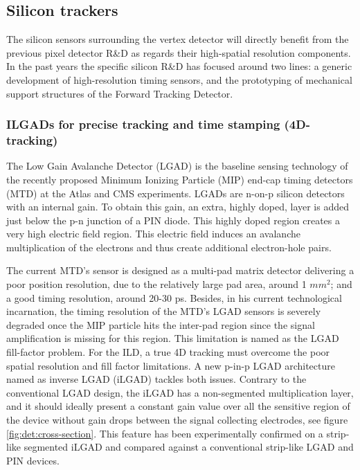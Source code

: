 \subsection{Silicon trackers}

The silicon sensors surrounding the vertex detector will directly benefit from the previous pixel detector R\&D as regards their high-spatial resolution components. In the past years the specific silicon R\&D has focused around two lines: a generic development of high-resolution timing sensors, and the prototyping of mechanical support structures of the Forward Tracking Detector.

\subsubsection{ILGADs for precise tracking and time stamping (4D-tracking)}

The Low Gain Avalanche Detector (LGAD) is the baseline sensing technology of the recently proposed Minimum Ionizing Particle (MIP) end-cap timing detectors (MTD) at the Atlas and CMS experiments. LGADs are n-on-p silicon detectors with an internal gain. To obtain this gain, an extra, highly doped, layer is added just below the p-n junction of a PIN diode. This highly doped region creates a very high electric field region. This electric field induces an avalanche multiplication of the electrons and thus create additional electron-hole pairs\cite{PELLEGRINI201412}. 

The current MTD's sensor is designed as a multi-pad matrix detector delivering a poor position resolution, due to the relatively large pad area, around 1 $mm^2$; and a good timing resolution, around 20-30 ps. Besides, in his current technological incarnation, the timing resolution of the MTD's LGAD sensors is severely degraded once the MIP particle hits the inter-pad region since the signal amplification is missing for this region. This limitation is named as the LGAD fill-factor problem. For the ILD, a true 4D tracking  must overcome the poor spatial resolution and fill factor limitations. A new p-in-p LGAD architecture named as inverse LGAD (iLGAD) tackles both issues\cite{Carulla_2016}. Contrary to the conventional LGAD design, the iLGAD has a non-segmented multiplication layer, and it should ideally present a constant gain value over all the sensitive region of the device without gain drops between the signal collecting electrodes, see figure\,\ref{fig:det:cross-section}. This feature has been experimentally confirmed on a strip-like segmented iLGAD and compared against a conventional strip-like LGAD and PIN devices\cite{Curras2019}. 

